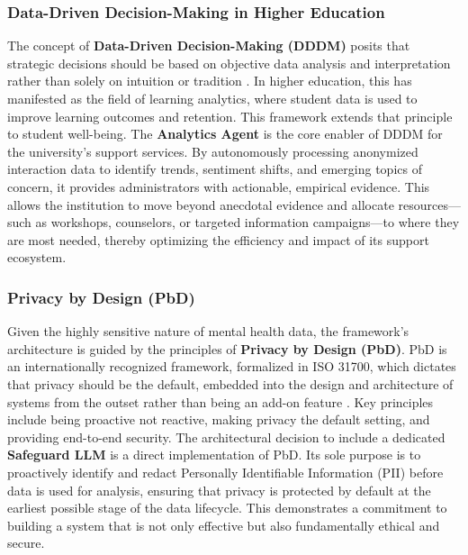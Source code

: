 \subsubsection{Data-Driven Decision-Making in Higher Education}
The concept of \textbf{Data-Driven Decision-Making (DDDM)} posits that strategic decisions should be based on objective data analysis and interpretation rather than solely on intuition or tradition \cite{FIND_CITATION_PLEASE}. In higher education, this has manifested as the field of learning analytics, where student data is used to improve learning outcomes and retention. This framework extends that principle to student well-being. The \textbf{Analytics Agent} is the core enabler of DDDM for the university's support services. By autonomously processing anonymized interaction data to identify trends, sentiment shifts, and emerging topics of concern, it provides administrators with actionable, empirical evidence. This allows the institution to move beyond anecdotal evidence and allocate resources—such as workshops, counselors, or targeted information campaigns—to where they are most needed, thereby optimizing the efficiency and impact of its support ecosystem.

\subsubsection{Privacy by Design (PbD)}
Given the highly sensitive nature of mental health data, the framework's architecture is guided by the principles of \textbf{Privacy by Design (PbD)}. PbD is an internationally recognized framework, formalized in ISO 31700, which dictates that privacy should be the default, embedded into the design and architecture of systems from the outset rather than being an add-on feature \cite{FIND_CITATION_PLEASE}. Key principles include being proactive not reactive, making privacy the default setting, and providing end-to-end security. The architectural decision to include a dedicated \textbf{Safeguard LLM} is a direct implementation of PbD. Its sole purpose is to proactively identify and redact Personally Identifiable Information (PII) before data is used for analysis, ensuring that privacy is protected by default at the earliest possible stage of the data lifecycle. This demonstrates a commitment to building a system that is not only effective but also fundamentally ethical and secure.

